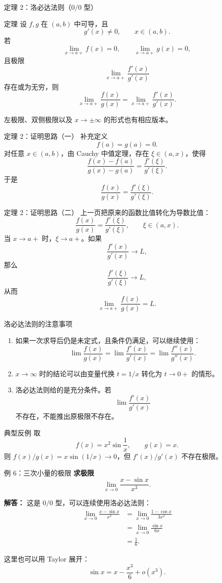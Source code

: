 \documentclass[aspectratio=169,11pt]{ctexbeamer}
\begin{document}
\begin{frame}{定理 2：洛必达法则（$0/0$ 型）}
\small
\begin{block}{定理}
设 $f,g$ 在 $(a,b)$ 中可导，且
\[
  g'(x)\ne0,\qquad x\in(a,b).
\]
若
\[
  \lim_{x\to a+}f(x)=0,\qquad \lim_{x\to a+}g(x)=0,
\]
且极限
\[
  \lim_{x\to a+}\frac{f'(x)}{g'(x)}
\]
存在或为无穷，则
\[
  \lim_{x\to a+}\frac{f(x)}{g(x)}
  =
  \lim_{x\to a+}\frac{f'(x)}{g'(x)}.
\]
\end{block}

左极限、双侧极限以及 $x\to\pm\infty$ 的形式也有相应版本。
\end{frame}

\begin{frame}{定理 2：证明思路（一）}
\small
补充定义
\[
  f(a)=g(a)=0.
\]
对任意 $x\in(a,b)$，由 Cauchy 中值定理，存在 $\xi\in(a,x)$，使得
\[
  \frac{f(x)-f(a)}{g(x)-g(a)}
  =
  \frac{f'(\xi)}{g'(\xi)}.
\]
于是
\[
  \frac{f(x)}{g(x)}
  =
  \frac{f'(\xi)}{g'(\xi)}.
\]
\end{frame}

\begin{frame}{定理 2：证明思路（二）}
\small
上一页把原来的函数比值转化为导数比值：
\[
  \frac{f(x)}{g(x)}
  =
  \frac{f'(\xi)}{g'(\xi)},\qquad \xi\in(a,x).
\]
当 $x\to a+$ 时，$\xi\to a+$。如果
\[
  \frac{f'(x)}{g'(x)}\to L,
\]
那么
\[
  \frac{f'(\xi)}{g'(\xi)}\to L,
\]
从而
\[
  \lim_{x\to a+}\frac{f(x)}{g(x)}=L.
\]
\end{frame}

\begin{frame}{洛必达法则的注意事项}
\small
\begin{enumerate}
  \item 如果一次求导后仍是未定式，且条件仍满足，可以继续使用：
  \[
    \lim\frac{f(x)}{g(x)}
    =
    \lim\frac{f'(x)}{g'(x)}
    =
    \lim\frac{f''(x)}{g''(x)}.
  \]
  \item $x\to\infty$ 时的结论可以由变量代换 $t=1/x$ 转化为 $t\to0+$ 的情形。
  \item 洛必达法则给的是充分条件。若
  \[
    \lim\frac{f'(x)}{g'(x)}
  \]
  不存在，不能推出原极限不存在。
\end{enumerate}

\begin{block}{典型反例}
取
\[
  f(x)=x^2\sin\frac1x,\qquad g(x)=x.
\]
则 $f(x)/g(x)=x\sin(1/x)\to0$，但 $f'(x)/g'(x)$ 不存在极限。
\end{block}
\end{frame}

\begin{frame}{例 6：三次小量的极限}
\small
\textbf{求极限}
\[
  \lim_{x\to0}\frac{x-\sin x}{x^3}.
\]

\textbf{解答：}
这是 $0/0$ 型，可以连续使用洛必达法则：
\[
\begin{aligned}
\lim_{x\to0}\frac{x-\sin x}{x^3}
&=\lim_{x\to0}\frac{1-\cos x}{3x^2}\\
&=\lim_{x\to0}\frac{\sin x}{6x}\\
&=\frac16.
\end{aligned}
\]

这里也可以用 Taylor 展开：
\[
  \sin x=x-\frac{x^3}{6}+o(x^3).
\]
\end{frame}
\end{document}
